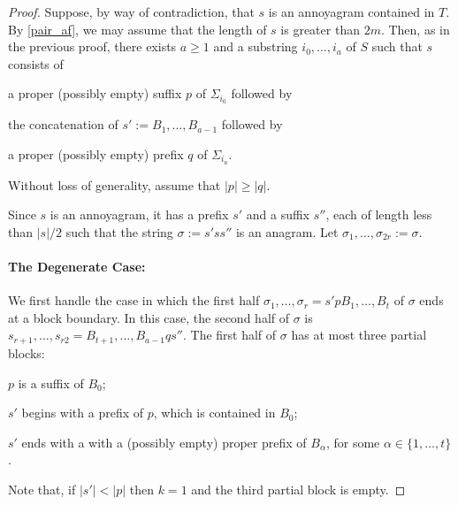 \documentclass[kpfonts]{patmorin}
\begin{document}
\begin{proof}
    Suppose, by way of contradiction, that $s$ is an annoyagram contained in $T$.  By \cref{pair_af}, we may assume that the length of $s$ is greater than $2m$.  Then, as in the previous proof, there exists $a\ge 1$ and a substring $i_0,\ldots,i_a$ of $S$ such that $s$ consists of
    \begin{inparaenum}[(i)]
        \item a proper (possibly empty) suffix $p$ of $\Sigma_{i_0}$ followed by
        \item the concatenation of $s':=B_1,\ldots,B_{a-1}$ followed by
        \item a proper (possibly empty) prefix $q$ of $\Sigma_{i_a}$.
    \end{inparaenum}
    Without loss of generality, assume that $|p|\ge |q|$.

    Since $s$ is an annoyagram, it has a prefix $s'$ and a suffix $s''$, each of length less than $|s|/2$ such that the string $\sigma:=s'ss''$ is an anagram.  Let $\sigma_1,\ldots,\sigma_{2r}:=\sigma$.

    \paragraph{The Degenerate Case:}
    We first handle the case in which the first half $\sigma_1,\ldots,\sigma_r=s'pB_1,\ldots,B_t$ of $\sigma$ ends at a block boundary. In this case, the second half of $\sigma$ is $s_{r+1},\ldots,s_{r2}=B_{t+1},\ldots,B_{a-1}q s''$.  The first half of $\sigma$ has at most three partial blocks:
    \begin{compactenum}
        \item $p$ is a suffix of $B_0$;
        \item $s'$ begins with a prefix of $p$, which is contained in $B_0$;
        \item $s'$ ends with a with a (possibly empty) proper prefix of $B_\alpha$, for some $\alpha\in\{1,\ldots,t\}$.
    \end{compactenum}
    Note that, if $|s'|<|p|$ then $k=1$ and the third partial block is empty.



\end{proof}
\end{document}
